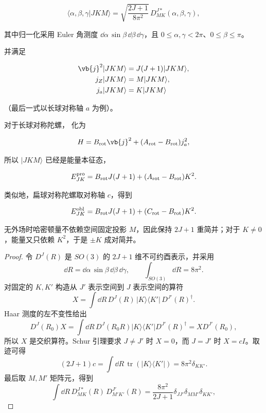\[
\langle\alpha,\beta,\gamma|JKM\rangle
=\sqrt{\frac{2J+1}{8\pi^2}}\,D^{J*}_{MK}(\alpha,\beta,\gamma),
\]

其中归一化采用 Euler 角测度 \(\dd\alpha\,\sin\beta\,\dd\beta\,\dd\gamma\)，且 \(0\le\alpha,\gamma<2\pi\)、\(0\le\beta\le\pi\)。

并满足

\begin{align*}
\vb{j}^2|JKM\rangle&=J(J+1)|JKM\rangle,\\
j_Z|JKM\rangle&=M|JKM\rangle,\\
j_a|JKM\rangle&=K|JKM\rangle
\end{align*}

（最后一式以长球对称轴 \(a\) 为例）。

对于长球对称陀螺， 化为

\[
H
=B_{\rm rot}\vb{j}^2
+(A_{\rm rot}-B_{\rm rot})j_a^2,
\]

所以 \(|JKM\rangle\) 已经是能量本征态，

\begin{equation}
E_{JK}^{\rm pro}
=B_{\rm rot}J(J+1)
+(A_{\rm rot}-B_{\rm rot})K^2.
\label{eq:prolate-symmetric-top-spectrum}
\end{equation}

类似地，扁球对称陀螺取对称轴 \(c\)，得到

\begin{equation}
E_{JK}^{\rm obl}
=B_{\rm rot}J(J+1)
+(C_{\rm rot}-B_{\rm rot})K^2.
\label{eq:oblate-symmetric-top-spectrum}
\end{equation}

无外场时哈密顿量不依赖空间固定投影 \(M\)，因此保持 \(2J+1\) 重简并；对于 \(K\neq0\)，能量又只依赖 \(K^2\)，于是 \(\pm K\) 成对简并。

\begin{proof}
令 \(D^J(R)\) 是 \(SO(3)\) 的 \(2J+1\) 维不可约酉表示，并采用
\[
 \dd R=\dd\alpha\,\sin\beta\,\dd\beta\,\dd\gamma,
 \qquad \int_{SO(3)}\dd R=8\pi^2 .
\]
对固定的 \(K,K'\) 构造从 \(J'\) 表示空间到 \(J\) 表示空间的算符
\begin{equation*}
 X
 =\int\dd R\,
 D^J(R)\,|K\rangle\langle K'|\,D^{J'}(R)^\dagger.
\end{equation*}
Haar 测度的左不变性给出
\begin{equation*}
 D^J(R_0)X
 =\int\dd R\,D^J(R_0R)|K\rangle\langle K'|D^{J'}(R)^\dagger
 =XD^{J'}(R_0),
\end{equation*}
所以 \(X\) 是交织算符。Schur 引理要求 \(J\ne J'\) 时
\(X=0\)，而 \(J=J'\) 时 \(X=cI\)。取迹可得
\[
 (2J+1)c
 =\int\dd R\,\operatorname{tr}(|K\rangle\langle K'|)
 =8\pi^2\delta_{KK'} .
\]
最后取 \(M,M'\) 矩阵元，得到
\begin{equation}\label{eq:wigner-d-haar-orthogonality}
 \int\dd R\,
 D^{J*}_{MK}(R)\,D^{J'}_{M'K'}(R)
 =\frac{8\pi^2}{2J+1}
 \delta_{JJ'}\delta_{MM'}\delta_{KK'},
\end{equation}
\end{proof}

